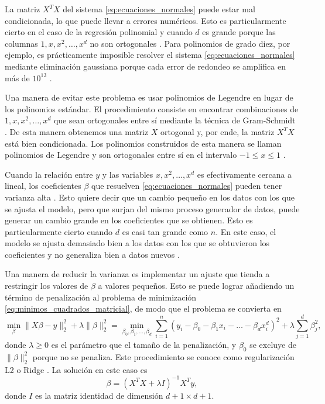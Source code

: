 \documentclass{article}
\begin{document}

La matriz $X^T X$ del sistema \ref{eq:ecuaciones_normales} puede estar mal condicionada, lo que puede llevar a errores numéricos. Esto es particularmente cierto en el caso de la regresión polinomial y cuando $d$ es grande porque las columnas $1, x, x^2, \ldots, x^d$ no son ortogonales \citep{strang2022introduction}. Para polinomios de grado diez, por ejemplo, es prácticamente imposible resolver el sistema \ref{eq:ecuaciones_normales} mediante eliminación gaussiana porque cada error de redondeo se amplifica en más de $10^{13}$ \citep{strang2022introduction}.

Una manera de evitar este problema es usar polinomios de Legendre en lugar de los polinomios estándar. El procedimiento consiste en encontrar combinaciones de $1, x, x^2, \ldots, x^d$ que sean ortogonales entre sí mediante la técnica de Gram-Schmidt \citep{strang2022introduction}. De esta manera obtenemos una matriz $X$ ortogonal y, por ende, la matriz $X^T X$ está bien condicionada. Los polinomios construidos de esta manera se llaman polinomios de Legendre y son ortogonales entre sí en el intervalo $-1 \leq x \leq 1$ \citep{strang2022introduction}.


Cuando la relación entre $y$ y las variables $x, x^2, \ldots, x^d$ es efectivamente cercana a lineal, los coeficientes $\beta$ que resuelven \ref{eq:ecuaciones_normales} pueden tener varianza alta \citep{james2013introduction}. Esto quiere decir que un cambio pequeño en los datos con los que se ajusta el modelo, pero que surjan del mismo proceso generador de datos, puede generar un cambio grande en los coeficientes que se obtienen. Esto es particularmente cierto cuando $d$ es casi tan grande como $n$. En este caso, el modelo se ajusta demasiado bien a los datos con los que se obtuvieron los coeficientes y no generaliza bien a datos nuevos \citep{james2013introduction}.

Una manera de reducir la varianza es implementar un ajuste que tienda a restringir los valores de $\beta$ a valores pequeños. Esto se puede lograr añadiendo un término de penalización al problema de minimización \ref{eq:minimos_cuadrados_matricial}, de modo que el problema se convierta en
%
\begin{equation} \label{eq:minimos_cuadrados_regularizacion}
    \min_{\beta} \lVert X \beta - y \rVert_2^2 + \lambda \lVert \beta \rVert_2^2 = 
    \min_{\beta_0, \beta_1, \ldots, \beta_d} \sum_{i=1}^n (y_i - \beta_0 - \beta_1 x_i - \ldots - \beta_d x_i^d)^2 + \lambda \sum_{j=1}^d \beta_j^2,
\end{equation}
%
donde $\lambda \geq 0$ es el parámetro que el tamaño de la penalización, y $\beta_0$ se excluye de $\lVert \beta \rVert_2^2$ porque no se penaliza. Este procedimiento se conoce como regularización L2 o Ridge \citep{james2013introduction}. La solución en este caso es 
%
\begin{equation} \label{eq:regularizacion_solucion}
    \beta = (X^T X + \lambda I)^{-1} X^T y,
\end{equation}
%
donde $I$ es la matriz identidad de dimensión $d+1 \times d+1$. 
\end{document}
